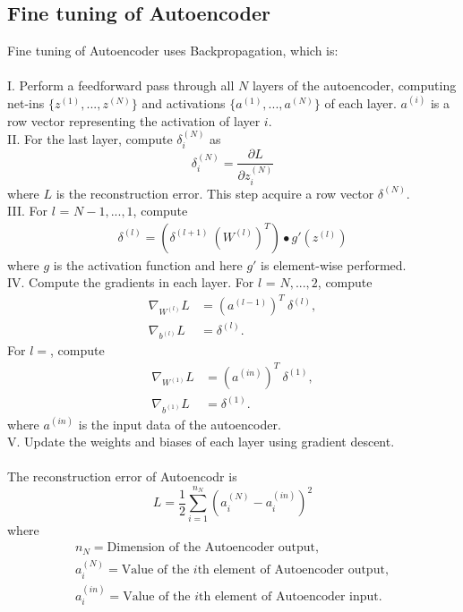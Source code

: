 \documentclass[12pt]{article}
\begin{document}
\subsection{Fine tuning of Autoencoder}
Fine tuning of Autoencoder uses Backpropagation, which is:\\
\\
I. Perform a feedforward pass through all $N$ layers of the autoencoder, computing net-ins $\{z^{(1)},..., z^{(N)}\}$ and activations $\{a^{(1)},..., a^{(N)}\}$ of each layer. $a^{(i)}$ is a row vector representing the activation of layer $i$. \\
II. For the last layer, compute $\delta_i^{(N)}$ as
\begin{equation}
\delta_i^{(N)} = \frac{\partial L}{\partial z^{(N)}_i}
\end{equation}
where $L$ is the reconstruction error. This step acquire a row vector $\delta^{(N)}$. \\
III. For $l$ = $N-1, ..., 1$, compute 
\begin{align}
\delta^{(l)} = \left(\delta^{(l+1)} ~ (W^{(l)})^T \right) \bullet g'(z^{(l)})
\end{align}
where $g$ is the activation function and here $g'$ is element-wise performed.\\
IV. Compute the gradients in each layer. For $l$ = $N, ..., 2$, compute 
\begin{align}
\nabla_{W^{(l)}} L &= (a^{(l-1)})^T~\delta^{(l)}, \\
\nabla_{b^{(l)}} L &= \delta^{(l)}.
\end{align}
For $l=$, compute
\begin{align}
\nabla_{W^{(1)}} L &= (a^{(in)})^T~\delta^{(1)}, \\
\nabla_{b^{(1)}} L &= \delta^{(1)}.
\end{align}
where $a^{(in)}$ is the input data of the autoencoder.\\
V. Update the weights and biases of each layer using gradient descent.\\
\\
The reconstruction error of Autoencodr is \begin{equation}
L = \frac{1}{2}\sum_{i=1}^{n_N}(a^{(N)}_i - a^{(in)}_i)^2
\end{equation}
where \begin{gather}
n_{N} = \text{Dimension of the Autoencoder output},\\
a^{(N)}_{i} = \text{Value of the }i\text{th element of Autoencoder output},\\
a^{(in)}_{i} = \text{Value of the }i\text{th element of Autoencoder input}.
\end{gather}
\end{document}
